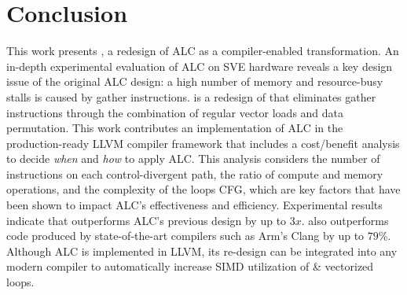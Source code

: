 \section{Conclusion}
\label{sec:conclusion}

This work presents \ALCdp, a redesign of ALC as a compiler-enabled transformation.
An in-depth experimental evaluation of ALC on SVE hardware reveals a key design issue of the original ALC design: a high number of memory and resource-busy stalls is caused by gather instructions.
\ALCdp is a redesign of \ALC that eliminates gather instructions through the combination of regular vector loads and data permutation.
This work contributes an implementation of ALC in the production-ready LLVM compiler framework that includes a cost/benefit analysis to decide \emph{when} and \emph{how} to apply ALC.
This analysis considers the number of instructions on each control-divergent path, the ratio of compute and memory operations, and the complexity of the loops CFG, which are key factors that have been shown to impact ALC's effectiveness and efficiency.
Experimental results indicate that \ALCdp outperforms ALC's previous design by up to $3x$.
\ALCdp also outperforms \ifconverted code produced by state-of-the-art compilers such as Arm's Clang by up to $79\%$.
Although ALC is implemented in LLVM, its re-design can be integrated into any modern compiler to automatically increase SIMD utilization of \ifconverted \& vectorized loops.